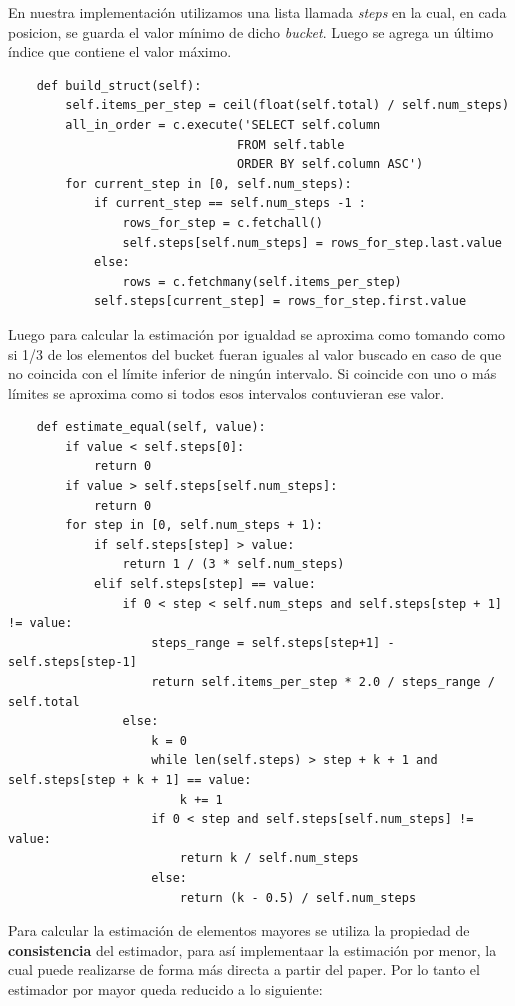 \documentclass[a4paper, 10pt, twoside]{article}
\begin{document}
 En nuestra implementación utilizamos una lista llamada \textit{steps} en la cual, en cada posicion, se guarda el valor mínimo de dicho \textit{bucket}. Luego se agrega un último índice que contiene el valor máximo.
\begin{verbatim}
    def build_struct(self):
        self.items_per_step = ceil(float(self.total) / self.num_steps)
        all_in_order = c.execute('SELECT self.column 
        						FROM self.table 
        						ORDER BY self.column ASC')
        for current_step in [0, self.num_steps):
            if current_step == self.num_steps -1 :
                rows_for_step = c.fetchall()
                self.steps[self.num_steps] = rows_for_step.last.value
            else:
                rows = c.fetchmany(self.items_per_step)
            self.steps[current_step] = rows_for_step.first.value
\end{verbatim}
Luego para calcular la estimación por igualdad se aproxima como tomando como si 1/3 de los elementos del bucket fueran iguales al valor buscado en caso de que no coincida con el límite inferior de ningún intervalo. Si coincide con uno o más límites se aproxima como si todos esos intervalos contuvieran ese valor.
\begin{verbatim}
    def estimate_equal(self, value):
        if value < self.steps[0]:
            return 0
        if value > self.steps[self.num_steps]:
            return 0
        for step in [0, self.num_steps + 1):
            if self.steps[step] > value:
                return 1 / (3 * self.num_steps)
            elif self.steps[step] == value:
                if 0 < step < self.num_steps and self.steps[step + 1] != value:
                    steps_range = self.steps[step+1] - self.steps[step-1]
                    return self.items_per_step * 2.0 / steps_range / self.total
                else:
                    k = 0
                    while len(self.steps) > step + k + 1 and self.steps[step + k + 1] == value:
                        k += 1
                    if 0 < step and self.steps[self.num_steps] != value:
                        return k / self.num_steps
                    else:
                        return (k - 0.5) / self.num_steps
\end{verbatim}
 Para calcular la estimación de elementos mayores se utiliza la propiedad de \textbf{consistencia} del estimador, para así implementaar la estimación por menor, la cual puede realizarse de forma más directa a partir del paper. Por lo tanto el estimador por mayor queda reducido a lo siguiente:
  
\end{document}

